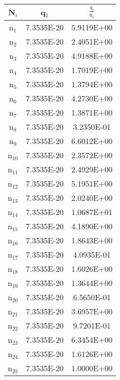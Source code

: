 \documentclass{article}
\begin{document}
\begin{enumerate}
\begin{table}[h!]
    \centering
    \begin{tabular}{|c|c|c|}
    \hline
       N$_{i}$  & q$_{1}$ & $\frac{q_{i}}{q_{1}}$\\
       \hline
       n$_{1}$  & 7.3535E-20 & 5.9119E+00\\
       \hline
       n$_{2}$  & 7.3535E-20 & 2.4051E+00\\
       \hline       
       n$_{3}$  & 7.3535E-20 & 4.9188E+00\\
       \hline       
       n$_{4}$  & 7.3535E-20 & 1.7019E+00\\
       \hline       
       n$_{5}$  & 7.3535E-20 & 1.3794E+00\\
       \hline       
       n$_{6}$  & 7.3535E-20 & 4.2730E+00\\
       \hline       
       n$_{7}$  & 7.3535E-20 & 1.3871E+00\\
       \hline       
       n$_{8}$  & 7.3535E-20 & 3.2350E-01\\
       \hline       
       n$_{9}$  & 7.3535E-20 & 6.6012E+00\\
       \hline       
       n$_{10}$  & 7.3535E-20 & 2.3572E+00\\
       \hline       
       n$_{11}$  & 7.3535E-20 & 2.4929E+00\\
       \hline       
       n$_{12}$  & 7.3535E-20 & 5.1951E+00\\
       \hline       
       n$_{13}$  & 7.3535E-20 & 2.0240E+00\\
       \hline       
       n$_{14}$  & 7.3535E-20 & 1.0687E+01\\
       \hline
       n$_{15}$  & 7.3535E-20 & 4.1890E+00\\
       \hline       
       n$_{16}$  & 7.3535E-20 & 1.8643E+00\\
       \hline       
       n$_{17}$  & 7.3535E-20 & 4.0935E-01\\
       \hline       
       n$_{18}$  & 7.3535E-20 & 1.6026E+00\\
       \hline       
       n$_{19}$  & 7.3535E-20 & 1.3644E+00\\
       \hline       
       n$_{20}$  & 7.3535E-20 & 6.5650E-01\\
       \hline       
       n$_{21}$  & 7.3535E-20 & 3.6957E+00\\
       \hline       
       n$_{22}$  & 7.3535E-20 & 9.7201E-01\\
       \hline       
       n$_{23}$  & 7.3535E-20 & 6.3454E+00\\
       \hline       
       n$_{24}$  & 7.3535E-20 & 1.6126E+00\\
       \hline       
       n$_{25}$  & 7.3535E-20 & 1.0000E+00\\
       \hline


\end{tabular}
\end{table}
\end{enumerate}
\end{document}
